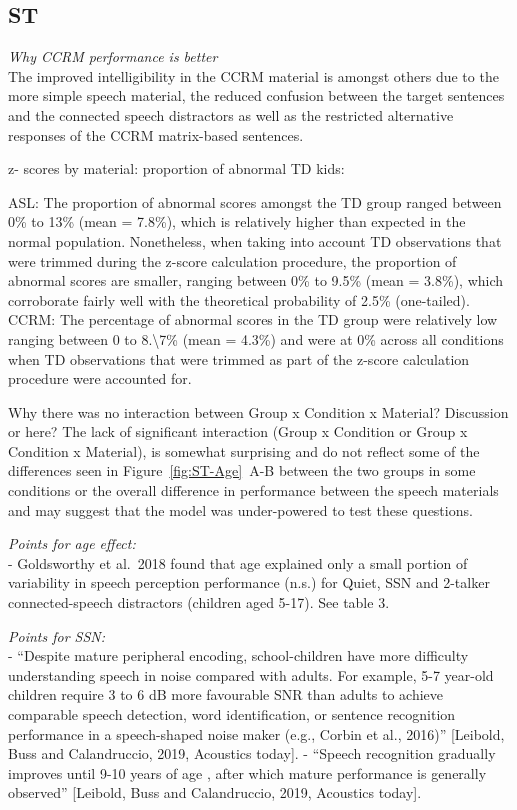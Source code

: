 \documentclass[a4paper, twoside]{templates/ociamthesis}
\begin{document}
\hypertarget{st-2}{%
\subsection{ST}\label{st-2}}

\colorbox[HTML]{CCCCFF}{\emph{Why CCRM performance is better}}\\
The improved intelligibility in the CCRM material is amongst others due to the more simple speech material, the reduced confusion between the target sentences and the connected speech distractors as well as the restricted alternative responses of the CCRM matrix-based sentences.

z- scores by material:
proportion of abnormal TD kids:

ASL:
The proportion of abnormal scores amongst the TD group ranged between 0\% to 13\% (mean = 7.8\%), which is relatively higher than expected in the normal population. Nonetheless, when taking into account TD observations that were trimmed during the z-score calculation procedure, the proportion of abnormal scores are smaller, ranging between 0\% to 9.5\% (mean = 3.8\%), which corroborate fairly well with the theoretical probability of 2.5\% (one-tailed).\\

CCRM:
The percentage of abnormal scores in the TD group were relatively low ranging between 0 to 8.\textbackslash7\% (mean = 4.3\%) and were at 0\% across all conditions when TD observations that were trimmed as part of the z-score calculation procedure were accounted for.

Why there was no interaction between Group x Condition x Material?
\colorbox[HTML]{CCCCFF}{Discussion or here?} The lack of significant interaction (Group x Condition or Group x Condition x Material), is somewhat surprising and do not reflect some of the differences seen in Figure~\ref{fig:ST-Age}~A-B between the two groups in some conditions or the overall difference in performance between the speech materials and may suggest that the model was under-powered to test these questions.

\emph{Points for age effect:}\\
- Goldsworthy et al.~2018 found that age explained only a small portion of variability in speech perception performance (n.s.) for Quiet, SSN and 2-talker connected-speech distractors (children aged 5-17). See table 3.

\emph{Points for SSN:}\\
- ``Despite mature peripheral encoding, school-children have more difficulty understanding speech in noise compared with adults. For example, 5-7 year-old children require 3 to 6 dB more favourable SNR than adults to achieve comparable speech detection, word identification, or sentence recognition performance in a speech-shaped noise maker (e.g., Corbin et al., 2016)'' {[}Leibold, Buss and Calandruccio, 2019, Acoustics today{]}. - ``Speech recognition gradually improves until 9-10 years of age , after which mature performance is generally observed'' {[}Leibold, Buss and Calandruccio, 2019, Acoustics today{]}.
\end{document}
